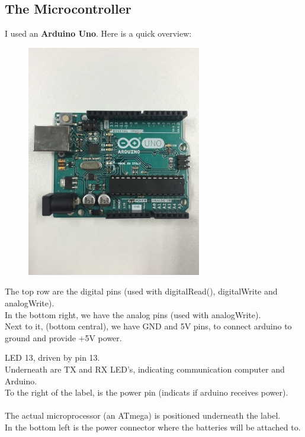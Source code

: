 \documentclass[final,3p,times]{article}
\begin{document}
\subsection{The Microcontroller}
I used an \textbf{Arduino Uno}. Here is a quick overview:
\begin{figure}[h]

\includegraphics[trim={0 28cm 0 30cm}, clip, width=3in]{./media/microController.jpg}
\label{fig:MicroController}
\end{figure}
\begin{description}[style=unboxed,leftmargin=0cm]
\item[Pin's]
The top row are the digital pins (used with digitalRead(), digitalWrite and analogWrite).\\
In the bottom right, we have the analog pins (used with analogWrite).\\
Next to it, (bottom central), we have GND and 5V pins, to connect arduino to ground and provide +5V power.
\item[LED's]
LED 13, driven by pin 13.\\
Underneath are TX and RX LED's, indicating communication computer and Arduino.\\
To the right of the label, is the power pin (indicats if arduino receives power).\\ \\
The actual microprocessor (an ATmega) is positioned underneath the label.\\
In the bottom left is the power connector where the batteries will be attached to.
\end{description}
\end{document}
